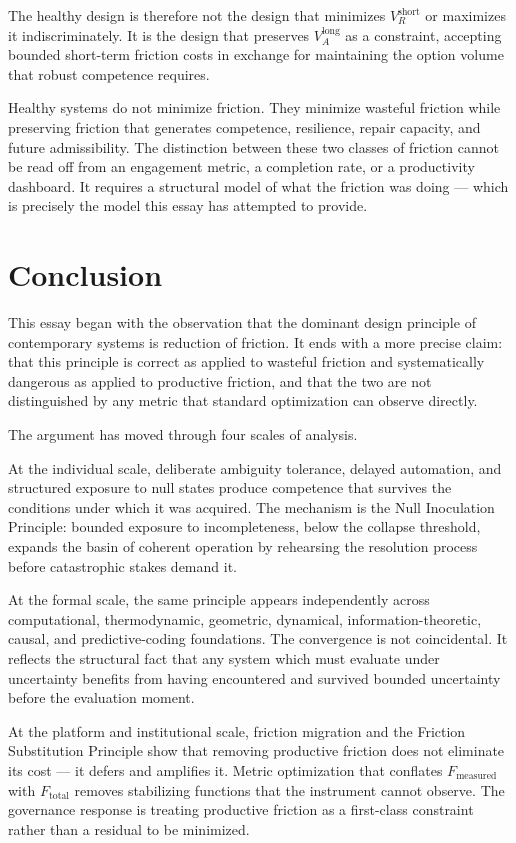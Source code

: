 \documentclass[11pt]{article}
\theoremstyle{remark}
\begin{document}
The healthy design is therefore not the design that minimizes $V_R^{\text{short}}$ or maximizes it indiscriminately. It is the design that preserves $V_A^{\text{long}}$ as a constraint, accepting bounded short-term friction costs in exchange for maintaining the option volume that robust competence requires.

Healthy systems do not minimize friction. They minimize wasteful friction while preserving friction that generates competence, resilience, repair capacity, and future admissibility. The distinction between these two classes of friction cannot be read off from an engagement metric, a completion rate, or a productivity dashboard. It requires a structural model of what the friction was doing --- which is precisely the model this essay has attempted to provide.

\section{Conclusion}
\label{sec:conclusion}

This essay began with the observation that the dominant design principle of contemporary systems is reduction of friction. It ends with a more precise claim: that this principle is correct as applied to wasteful friction and systematically dangerous as applied to productive friction, and that the two are not distinguished by any metric that standard optimization can observe directly.

The argument has moved through four scales of analysis.

At the individual scale, deliberate ambiguity tolerance, delayed automation, and structured exposure to null states produce competence that survives the conditions under which it was acquired. The mechanism is the Null Inoculation Principle: bounded exposure to incompleteness, below the collapse threshold, expands the basin of coherent operation by rehearsing the resolution process before catastrophic stakes demand it.

At the formal scale, the same principle appears independently across computational, thermodynamic, geometric, dynamical, information-theoretic, causal, and predictive-coding foundations. The convergence is not coincidental. It reflects the structural fact that any system which must evaluate under uncertainty benefits from having encountered and survived bounded uncertainty before the evaluation moment.

At the platform and institutional scale, friction migration and the Friction Substitution Principle show that removing productive friction does not eliminate its cost --- it defers and amplifies it. Metric optimization that conflates $F_{\text{measured}}$ with $F_{\text{total}}$ removes stabilizing functions that the instrument cannot observe. The governance response is treating productive friction as a first-class constraint rather than a residual to be minimized.
\end{document}
